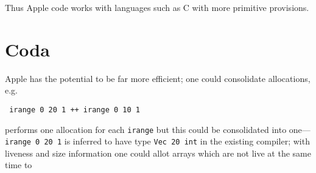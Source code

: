 \documentclass[sigplan,screen,anonymous]{acmart}
\begin{document}
Thus Apple code works with languages such as C with more primitive provisions.

\section{Coda}

Apple has the potential to be far more efficient; one could consolidate allocations, e.g.

\begin{verbatim}
 irange 0 20 1 ++ irange 0 10 1
\end{verbatim}
performs one allocation for each {\tt irange} but this could be consolidated into one---{\tt irange 0 20 1} is inferred to have type {\tt Vec 20 int} in the existing compiler; with liveness and size information one could allot arrays which are not live at the same time to %




\end{document}
